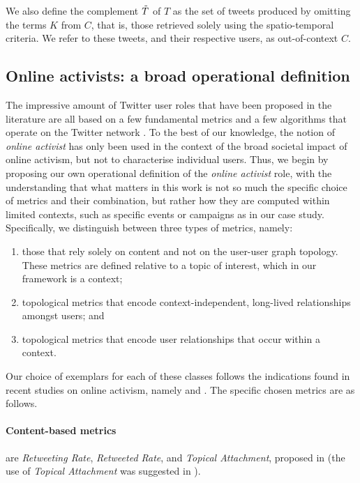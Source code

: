 \documentclass[runningheads]{llncs}
\begin{document}
We also define the complement $\Tilde{T}$ of $T$ as the set of tweets produced by omitting the terms $K$ from $C$, that is, those retrieved solely using the spatio-temporal criteria. 
We refer to these tweets, and their respective users, as out-of-context $C$.

\subsection{Online activists: a broad operational definition}


The impressive amount of  Twitter user roles that have been proposed in the literature are all based on a few fundamental metrics and a few algorithms that operate on the Twitter network \cite{RIQUELME2016949}.
To the best of our knowledge, the notion of \textit{online activist} has only been used in the context of the broad societal impact of online activism, but not to characterise  individual users.
Thus, we begin by proposing our own operational definition of the \textit{online activist} role, with the understanding that what matters in this work is not so much the specific choice of metrics and their combination, but rather how they are computed within limited contexts, such as specific events or campaigns as in our case study.
Specifically, we distinguish between three types of metrics, namely:
\begin{enumerate}
    \item those that rely solely on content and not on the user-user graph topology. These metrics are defined relative to a topic of interest, which in our framework is a context;
\item topological metrics that encode context-independent, long-lived relationships amongst users; and 
\item topological metrics that encode user relationships that occur within a context.
\end{enumerate}

Our choice of exemplars for each of these classes follows the indications found in recent studies on online activism, namely \cite{Lotan2011} and  \cite{Poell2014}.
The specific chosen metrics are as follows.

\paragraph{Content-based metrics} are \textit{Retweeting Rate}, \textit{Retweeted Rate}, and  \textit{Topical Attachment}, proposed in \cite{Bizid:2015} (the use of \textit{Topical Attachment} was suggested in \cite{Poell2014}).
\end{document}
